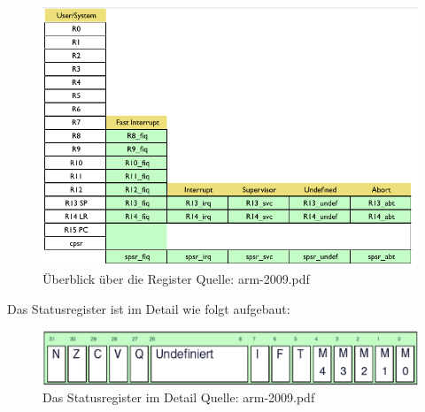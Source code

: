\begin{figure}
\includegraphics[width=\columnwidth]{bilder/overviewRegister} 
\caption{Überblick über die Register Quelle: arm-2009.pdf}
\label{Register}
\end{figure}

Das Statusregister ist im Detail wie folgt aufgebaut:
\begin{figure}
\includegraphics[width=\columnwidth]{bilder/statusRegister} 
\caption{Das Statusregister im Detail Quelle: arm-2009.pdf}
\label{Statusregister}
\end{figure}
 
